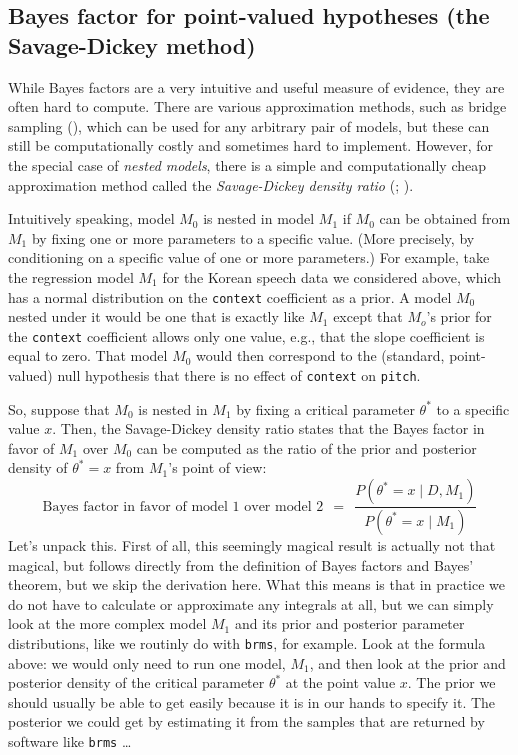 \documentclass[
  doc,
  floatsintext,
  longtable,
  nolmodern,
  notxfonts,
  notimes,
  colorlinks=true,linkcolor=blue,citecolor=blue,urlcolor=blue]{apa7}
\begin{document}
\subsection{Bayes factor for point-valued hypotheses (the Savage-Dickey
method)}\label{bayes-factor-for-point-valued-hypotheses-the-savage-dickey-method}

While Bayes factors are a very intuitive and useful measure of evidence,
they are often hard to compute. There are various approximation methods,
such as bridge sampling
(), which can be used for any arbitrary pair of models, but these
can still be computationally costly and sometimes hard to implement.
However, for the special case of \emph{nested models}, there is a simple
and computationally cheap approximation method called the
\emph{Savage-Dickey density ratio}
(;
).

Intuitively speaking, model \(M_0\) is nested in model \(M_1\) if
\(M_0\) can be obtained from \(M_1\) by fixing one or more parameters to
a specific value. (More precisely, by conditioning on a specific value
of one or more parameters.) For example, take the regression model
\(M_1\) for the Korean speech data we considered above, which has a
normal distribution on the \texttt{context} coefficient as a prior. A
model \(M_0\) nested under it would be one that is exactly like \(M_1\)
except that \(M_o\)'s prior for the \texttt{context} coefficient allows
only one value, e.g., that the slope coefficient is equal to zero. That
model \(M_0\) would then correspond to the (standard, point-valued) null
hypothesis that there is no effect of \texttt{context} on
\texttt{pitch}.

So, suppose that \(M_0\) is nested in \(M_1\) by fixing a critical
parameter \(\theta^*\) to a specific value \(x\). Then, the
Savage-Dickey density ratio states that the Bayes factor in favor of
\(M_1\) over \(M_0\) can be computed as the ratio of the prior and
posterior density of \(\theta^*=x\) from \(M_1\)'s point of view: \[
\text{Bayes factor in favor of model 1 over model 2} \ \  = \ \  \frac{P(\theta^*=x \mid D, M_1)}{P(\theta^*=x \mid M_1)}
\] Let's unpack this. First of all, this seemingly magical result is
actually not that magical, but follows directly from the definition of
Bayes factors and Bayes' theorem, but we skip the derivation here. What
this means is that in practice we do not have to calculate or
approximate any integrals at all, but we can simply look at the more
complex model \(M_1\) and its prior and posterior parameter
distributions, like we routinly do with \texttt{brms}, for example. Look
at the formula above: we would only need to run one model, \(M_1\), and
then look at the prior and posterior density of the critical parameter
\(\theta^*\) at the point value \(x\). The prior we should usually be
able to get easily because it is in our hands to specify it. The
posterior we could get by estimating it from the samples that are
returned by software like \texttt{brms} \ldots{}
\end{document}
